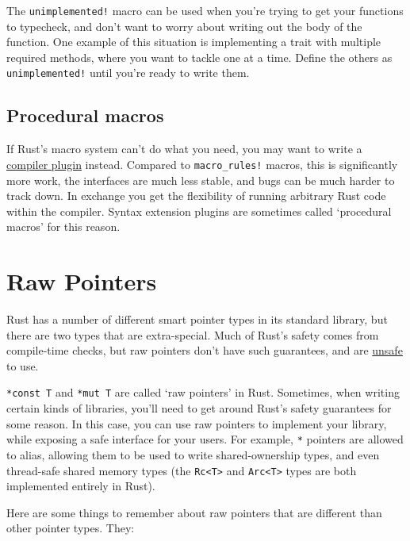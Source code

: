 \documentclass[a4paper,]{book}
\begin{document}
The \texttt{unimplemented!} macro can be used when you're trying to get
your functions to typecheck, and don't want to worry about writing out
the body of the function. One example of this situation is implementing
a trait with multiple required methods, where you want to tackle one at
a time. Define the others as \texttt{unimplemented!} until you're ready
to write them.

\subsection{Procedural macros}\label{procedural-macros}

If Rust's macro system can't do what you need, you may want to write a
\protect\hyperlink{sec--compiler-plugins}{compiler plugin} instead.
Compared to \texttt{macro\_rules!} macros, this is significantly more
work, the interfaces are much less stable, and bugs can be much harder
to track down. In exchange you get the flexibility of running arbitrary
Rust code within the compiler. Syntax extension plugins are sometimes
called `procedural macros' for this reason.

\hypertarget{sec--raw-pointers}{\section{Raw
Pointers}\label{sec--raw-pointers}}

Rust has a number of different smart pointer types in its standard
library, but there are two types that are extra-special. Much of Rust's
safety comes from compile-time checks, but raw pointers don't have such
guarantees, and are \protect\hyperlink{sec--unsafe}{unsafe} to use.

\texttt{*const\ T} and \texttt{*mut\ T} are called `raw pointers' in
Rust. Sometimes, when writing certain kinds of libraries, you'll need to
get around Rust's safety guarantees for some reason. In this case, you
can use raw pointers to implement your library, while exposing a safe
interface for your users. For example, \texttt{*} pointers are allowed
to alias, allowing them to be used to write shared-ownership types, and
even thread-safe shared memory types (the
\texttt{Rc\textless{}T\textgreater{}} and
\texttt{Arc\textless{}T\textgreater{}} types are both implemented
entirely in Rust).

Here are some things to remember about raw pointers that are different
than other pointer types. They:
\end{document}
